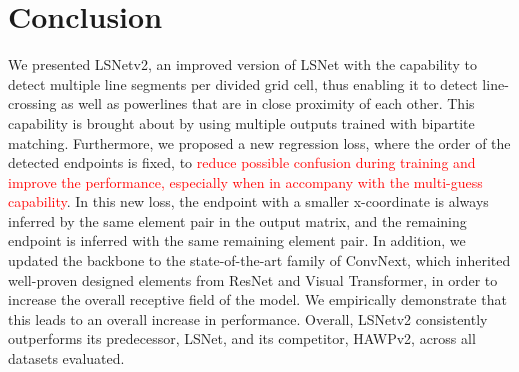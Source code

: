 \documentclass[journal]{IEEEtran}
\newcommand{\textK}[1]{\textcolor{red}{#1}}
\begin{document}
\section{Conclusion}
We presented LSNetv2, an improved version of LSNet with the capability to detect multiple line segments per divided grid cell, thus enabling it to detect line-crossing as well as powerlines that are in close proximity of each other.  This capability is brought about by using multiple outputs trained with bipartite matching. Furthermore, we proposed a new regression loss, where the order of the detected endpoints is fixed, to \textK{reduce possible confusion during training and improve the performance, especially when in accompany with the multi-guess capability}. In this new loss, the endpoint with a smaller x-coordinate is always inferred by the same element pair in the output matrix, and the remaining endpoint is inferred with the same remaining element pair. In addition, we updated the backbone to the state-of-the-art family of ConvNext, which inherited well-proven designed elements from ResNet and Visual Transformer, in order to increase the overall receptive field of the model. We empirically demonstrate that this leads to an overall increase in performance.
Overall, LSNetv2 consistently outperforms its predecessor, LSNet, and its competitor, HAWPv2, across all datasets evaluated. %








%
\end{document}
